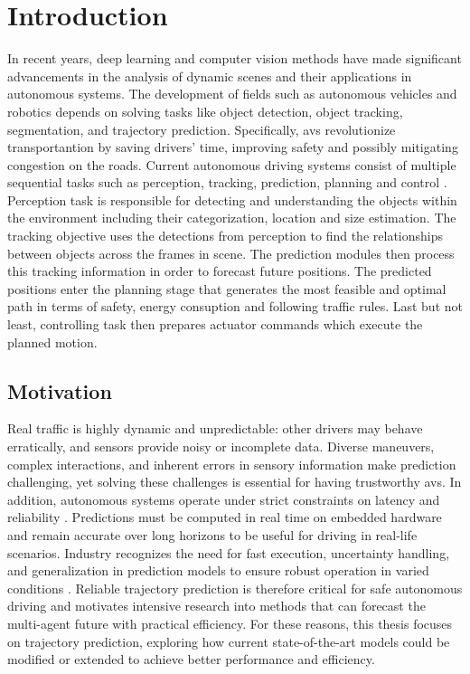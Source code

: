 \chapter{Introduction}
\label{chapter:intro}


In recent years, deep learning and computer vision methods have made significant advancements in the analysis 
of dynamic scenes and their applications in autonomous systems. The development of fields such as autonomous 
vehicles and robotics depends on solving tasks like object detection, object tracking, segmentation, and 
trajectory prediction. Specifically, \ac{avs} revolutionize transportantion by saving drivers' time, improving safety and
possibly mitigating congestion on the roads. Current autonomous driving systems consist of multiple sequential tasks such as perception,
tracking, prediction, planning and control \cite{chen2024end}. Perception task is responsible for detecting and understanding
the objects within the environment including their categorization, location and size estimation. The tracking objective
uses the detections from perception to find the relationships between objects across the frames in scene. The prediction 
modules then process this tracking information in order to forecast future positions. The predicted positions enter the
planning stage that generates the most feasible and optimal path in terms of safety, energy consuption and following traffic rules.
Last but not least, controlling task then prepares actuator commands which execute the planned motion.

\section{Motivation}
Real traffic is highly dynamic and unpredictable: other drivers may behave erratically, and sensors provide 
noisy or incomplete data. Diverse maneuvers, complex interactions, and inherent errors in sensory information 
make prediction challenging, yet solving these challenges is essential for having trustworthy \ac{avs}. 
In addition, autonomous systems operate under strict constraints on latency and reliability \cite{huang2022survey}. 
Predictions must be computed in real time on embedded hardware and remain accurate over long horizons to be useful 
for driving in real-life scenarios. Industry recognizes the need for fast execution, uncertainty handling, and generalization 
in prediction models to ensure robust operation in varied conditions \cite{Ettinger2021WOMD,Wayformer2022,ISO21448}. 
Reliable trajectory prediction is therefore critical for safe autonomous driving and motivates intensive 
research into methods that can forecast the multi-agent future with practical efficiency. For these reasons, this 
thesis focuses on trajectory prediction, exploring how current state-of-the-art models could be modified or extended
to achieve better performance and efficiency.


